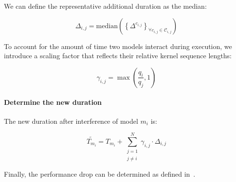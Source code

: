 We can define the representative additional duration as the median:

$$
	\Delta_{i,j} = \text{median}\left(\left\{ \Delta^{c_{i,j}} \right\}_{\forall c_{i,j} \in \mathcal{C}_{i,j}}\right)
$$

To account for the amount of time two models interact during execution, we introduce a scaling factor that reflects their relative kernel sequence lengths:

$$
	\gamma_{i,j} = \max\left(\frac{q_i}{q_j}, 1\right)
$$

\paragraph{Determine the new duration} The new duration after interference of model $m_i$ is:

$$
	\tilde{T_{m_i}} = T_{m_i} + \sum_{\substack{j=1 \\ j \neq i}}^{N} \gamma_{i,j} \cdot \Delta_{i,j}
$$

Finally, the performance drop can be determined as defined in~.






